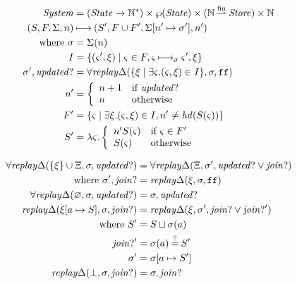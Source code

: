 \documentclass{llncs}
\newcommand{\finto}{\mathbin{\overset{\text{fin}}{\rightharpoonup}}}
\begin{document}
\begin{align*}
\System &= (\State \to {\mathbb N}^*) \times \wp(\State) \times ({\mathbb N} \finto \Store) \times {\mathbb N} \\
(S,F,\Sigma,n) &\machstep (S', F \cup F', \Sigma[n' \mapsto \msto'],n') \\
 \text{ where }
 \msto &= \Sigma(n) \\
  I &= \setof{ \ttuple{\mstate'}{\msdiff} \mid \mstate \in F, \mstate \machstep_\msto \mstate', \msdiff} \\
  \msto',\updatedp &=
     \replaychangeall(\setof{\msdiff \mid \exists \mstate. (\mstate, \msdiff) \in I}, \msto,\sfalse) \\
  n' &= \left\{\begin{array}{ll}
                n + 1 & \text{if } \updatedp \\
                n & \text{otherwise}
               \end{array}\right. \\
  F' &= \setof{\mstate \mid \exists \msdiff. (\mstate,\msdiff) \in I,
                n' \neq \hd(S(\mstate))} \\
  S' &= \lambda \mstate. \left\{\begin{array}{ll}
                                 n' S(\mstate) & \text{if } \mstate \in F' \\
                                 S(\mstate) & \text{otherwise}
                                \end{array}\right.
\end{align*}

\begin{align*}
  \forall\mathit{replay}\Delta(\{\xi\} \cup \Xi, \sigma, \mathit{updated?}) &=
    \forall\mathit{replay}\Delta(\Xi, \sigma', \mathit{updated?} \vee \mathit{join?}) \\
   \text{ where } \sigma', \mathit{join?} &= \mathit{replay}\Delta(\xi, \sigma, {\tt ff}) \\
  \forall\mathit{replay}\Delta(\varnothing, \sigma, \mathit{updated?}) &= \sigma, \mathit{updated?} \\
  \mathit{replay}\Delta(\xi[a \mapsto S], \sigma, \mathit{join?}) &=
   \mathit{replay}\Delta(\xi, \sigma', \mathit{join?} \vee \mathit{join?}') \\
  \text{ where } S' &= S \sqcup \sigma(a) \\
                 \mathit{join?}' &= \sigma(a) \mathbin{\overset{?}{=}} S' \\
                 \sigma' &= \sigma[a \mapsto S'] \\
  \mathit{replay}\Delta(\bot, \sigma, \mathit{join?}) &= \sigma, \mathit{join?}
\end{align*}
\end{document}
